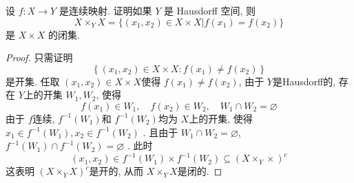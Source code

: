 \documentclass[../main.tex]{subfiles}
\begin{document}
\begin{exercise}{}{}
设 $f: X \to Y$ 是连续映射. 证明如果 $Y$ 是 Hausdorff 空间, 则
\[
X \times_Y X = \{(x_1, x_2) \in X \times X | f(x_1) = f(x_2)\}
\]
是 $X \times X$ 的闭集.
\end{exercise}

\begin{proof}
    只需证明 \[
    \left\{ \left( x_1,x_2 \right)\in X\times X: f\left( x_1 \right)\neq f\left( x_2 \right)    \right\}
    \]是开集. 任取 \(  \left( x_1,x_2 \right)\in X\times X   \)使得 \(  f\left( x_1 \right)\neq f\left( x_2 \right)    \), 由于 \(  Y  \)是Hausdorff的, 存在 \(  Y  \)上的开集 \(  W_1 , W_2  \), 使得 \[
    f\left( x_1 \right)\in W_1,\quad f\left( x_2 \right)\in W_2,\quad W_1\cap W_2= \varnothing  
    \]    由于 \(  f  \)连续,  \(  f^{-1} \left( W_1 \right)   \)和 \(  f^{-1} \left( W_2 \right)   \)均为 \(  X  \)上的开集, 使得 \(  x_1\in f^{-1} \left( W_1 \right), x_2 \in f^{-1} \left( W_2 \right)    \) . 且由于 \(  W_1\cap W_2= \varnothing  \), \(  f^{-1} \left( W_1 \right)\cap f^{-1} \left( W_2 \right)= \varnothing    \)      . 此时 \[
    \left( x_1,x_2 \right) \in f^{-1} \left( W_1 \right)\times f^{-1} \left( W_2 \right)\subseteq \left( X \times _{Y}\times  \right)^{c}    
    \]这表明 \(  \left( X \times _{Y}X \right)^{c}   \)是开的, 从而 \(  X\times _{Y}X  \)是闭的.   
\end{proof}
\end{document}
